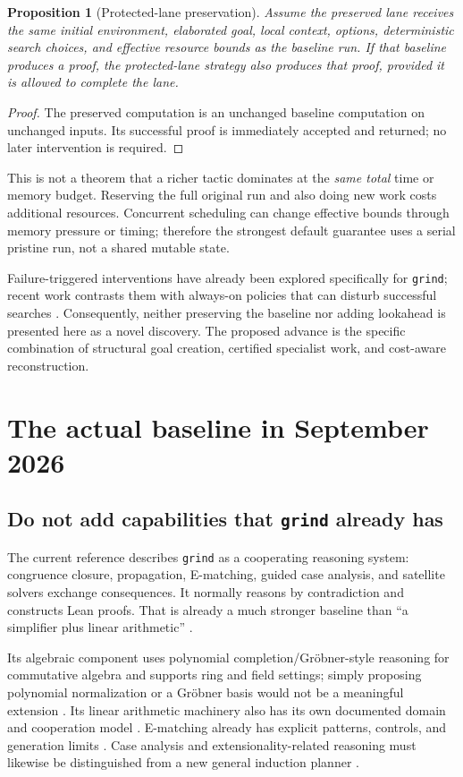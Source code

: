 \documentclass[11pt,letterpaper]{article}
\newcommand{\code}[1]{\texttt{#1}}
\newtheorem{proposition}[theorem]{Proposition}
\theoremstyle{definition}\newtheorem{definition}[theorem]{Definition}
\theoremstyle{remark}\newtheorem{remark}[theorem]{Remark}
\begin{document}
\begin{proposition}[Protected-lane preservation]
Assume the preserved lane receives the same initial environment, elaborated goal, local context, options, deterministic search choices, and effective resource bounds as the baseline run. If that baseline produces a proof, the protected-lane strategy also produces that proof, provided it is allowed to complete the lane.
\end{proposition}
\begin{proof}
The preserved computation is an unchanged baseline computation on unchanged inputs. Its successful proof is immediately accepted and returned; no later intervention is required.
\end{proof}
This is not a theorem that a richer tactic dominates at the \emph{same total} time or memory budget. Reserving the full original run and also doing new work costs additional resources. Concurrent scheduling can change effective bounds through memory pressure or timing; therefore the strongest default guarantee uses a serial pristine run, not a shared mutable state.

Failure-triggered interventions have already been explored specifically for \code{grind}; recent work contrasts them with always-on policies that can disturb successful searches \cite{interventions}. Consequently, neither preserving the baseline nor adding lookahead is presented here as a novel discovery. The proposed advance is the specific combination of structural goal creation, certified specialist work, and cost-aware reconstruction.

\section{The actual baseline in September 2026}
\subsection{Do not add capabilities that \texttt{grind} already has}
The current reference describes \code{grind} as a cooperating reasoning system: congruence closure, propagation, E-matching, guided case analysis, and satellite solvers exchange consequences. It normally reasons by contradiction and constructs Lean proofs. That is already a much stronger baseline than ``a simplifier plus linear arithmetic'' \cite{grind}.

Its algebraic component uses polynomial completion/Gr\"obner-style reasoning for commutative algebra and supports ring and field settings; simply proposing polynomial normalization or a Gr\"obner basis would not be a meaningful extension \cite{algebra}. Its linear arithmetic machinery also has its own documented domain and cooperation model \cite{linear}. E-matching already has explicit patterns, controls, and generation limits \cite{ematch}. Case analysis and extensionality-related reasoning must likewise be distinguished from a new general induction planner \cite{cases}.
\end{document}

